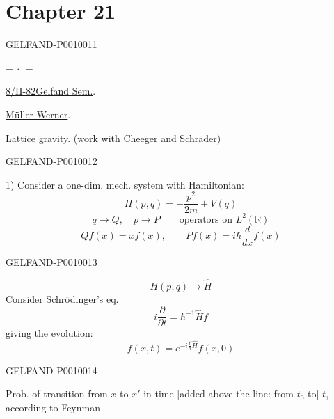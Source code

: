 \section*{Chapter 21}
\begin{GelfandAdjacentEvidence}{GELFAND-P001001}{1}
\begin{center}$-\ \cdot\ -$\end{center}
\underline{\underline{8/II-82}}\qquad\underline{Gelfand Sem.}.

\underline{\underline{Müller Werner}}.

\underline{Lattice gravity}. (work with Cheeger and Schräder)
\end{GelfandAdjacentEvidence}
\begin{GelfandAdjacentEvidence}{GELFAND-P001001}{2}


1) Consider a one-dim. mech. system with Hamiltonian:
\begin{equation*}
H(p,q)=+\frac{p^2}{2m}+V(q)
\tag{1}
\end{equation*}
\[
q\to Q,\quad p\to P\qquad \text{operators on }L^2(\mathbb R)
\]
\[
Qf(x)=xf(x),\qquad Pf(x)=i\hbar\frac{d}{dx}f(x)
\]
\end{GelfandAdjacentEvidence}
\begin{GelfandAdjacentEvidence}{GELFAND-P001001}{3}

\[
H(p,q)\to\widehat H
\]
Consider Schrödinger's eq.
\begin{equation*}
i\frac{\partial}{\partial t}=\hbar^{-1}\widehat H f
\tag{2}
\end{equation*}
giving the evolution:
\begin{equation*}
f(x,t)=e^{-i\frac{t}{\hbar}\widehat H}f(x,0)
\tag{3}
\end{equation*}
\end{GelfandAdjacentEvidence}
\begin{GelfandAdjacentEvidence}{GELFAND-P001001}{4}


Prob. of transition from $x$ to $x'$ in time [added above the line: from $t_0$ to] $t$, according to Feynman
\end{GelfandAdjacentEvidence}
